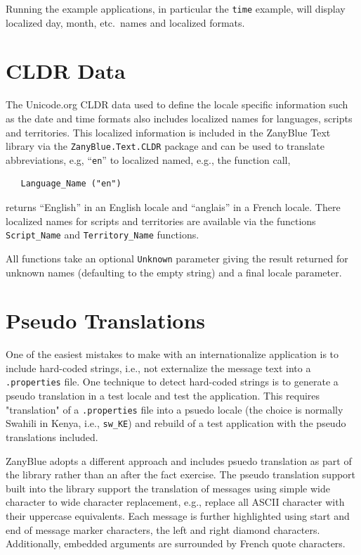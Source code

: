 Running the example applications, in particular the \texttt{time} example,
will display localized day, month, etc.\ names and localized formats.

\section{CLDR Data}

The Unicode.org CLDR data used to define the locale specific information
such as the date and time formats also includes localized names for languages,
scripts and territories.  This localized information is included in the
ZanyBlue Text library via the \verb|ZanyBlue.Text.CLDR| package and can
be used to translate abbreviations, e.g, ``\texttt{en}'' to localized
named, e.g., the function call,
\begin{xmpl}
\begin{verbatim}
   Language_Name ("en")
\end{verbatim}
\end{xmpl}
returns ``English'' in an English locale and ``anglais'' in a French locale.
There localized names for scripts and territories are available via the functions
\verb|Script_Name| and \verb|Territory_Name| functions.

All functions take an optional \verb|Unknown| parameter giving the result
returned for unknown names (defaulting to the empty string) and a final
locale parameter.

\section{Pseudo Translations}
\label{sec_pseudo_translation}
\label{sec:pseudo-translation}

One of the easiest mistakes to make with an internationalize application is
to include hard-coded strings, i.e., not externalize the message text into
a \texttt{.properties} file.  One technique to detect hard-coded strings
is to generate a pseudo translation in a test locale and test the application.
This requires "translation" of a \texttt{.properties} file into a psuedo
locale (the choice is normally Swahili in Kenya, i.e., \verb|sw_KE|) and
rebuild of a test application with the pseudo translations included.

ZanyBlue adopts a different approach and includes psuedo translation as
part of the library rather than an after the fact exercise.  The pseudo
translation support built into the library support the translation of
messages using simple wide character to wide character replacement, e.g.,
replace all ASCII character with their uppercase equivalents.  Each message
is further highlighted using start and end of message marker characters,
the left and right diamond characters.  Additionally, embedded arguments
are surrounded by French quote characters.

